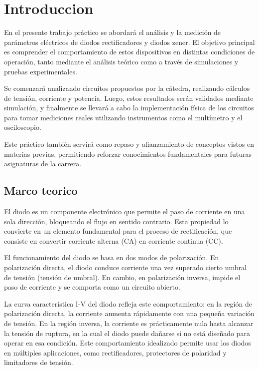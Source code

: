 \chapter{Introduccion}

En el presente trabajo práctico se abordará el análisis y la medición de parámetros eléctricos de diodos rectificadores y diodos zener. El objetivo principal es comprender el comportamiento de estos dispositivos en distintas condiciones de operación, tanto mediante el análisis teórico como a través de simulaciones y pruebas experimentales.

Se comenzará analizando circuitos propuestos por la cátedra, realizando cálculos de tensión, corriente y potencia. Luego, estos resultados serán validados mediante simulación, y finalmente se llevará a cabo la implementación física de los circuitos para tomar mediciones reales utilizando instrumentos como el multímetro y el osciloscopio.

Este práctico también servirá como repaso y afianzamiento de conceptos vistos en materias previas, permitiendo reforzar conocimientos fundamentales para futuras asignaturas de la carrera.

\section{Marco teorico}

El diodo es un componente electrónico que permite el paso de corriente en una sola dirección, bloqueando el flujo en sentido contrario. Esta propiedad lo convierte en un elemento fundamental para el proceso de rectificación, que consiste en convertir corriente alterna (CA) en corriente continua (CC).

El funcionamiento del diodo se basa en dos modos de polarización. En polarización directa, el diodo conduce corriente una vez superado cierto umbral de tensión (tensión de umbral). En cambio, en polarización inversa, impide el paso de corriente y se comporta como un circuito abierto.

La curva característica I-V del diodo refleja este comportamiento: en la región de polarización directa, la corriente aumenta rápidamente con una pequeña variación de tensión. En la región inversa, la corriente es prácticamente nula hasta alcanzar la tensión de ruptura, en la cual el diodo puede dañarse si no está diseñado para operar en esa condición.
Este comportamiento idealizado permite usar los diodos en múltiples aplicaciones, como rectificadores, protectores de polaridad y limitadores de tensión.

